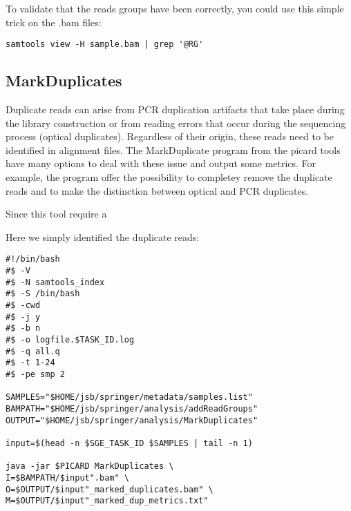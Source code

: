 To validate that the reads groups have been correctly, you could use this simple trick on the .bam files:

\begin{verbatim}
samtools view -H sample.bam | grep '@RG' 
\end{verbatim}






\subsection{MarkDuplicates}








Duplicate reads can arise from PCR duplication artifacts that take place during the library construction or from reading errors that occur during the sequencing process (optical duplicates). Regardless of their origin, these reads need to be identified in alignment files. The MarkDuplicate program from the picard tools have many options to deal with these issue and output some metrics. For example, the program offer the possibility to completey remove the duplicate reads and to make the distinction between optical and PCR duplicates.

Since this tool require a











Here we simply identified the duplicate reads:

\begin{verbatim}
#!/bin/bash
#$ -V
#$ -N samtools_index
#$ -S /bin/bash
#$ -cwd
#$ -j y
#$ -b n
#$ -o logfile.$TASK_ID.log
#$ -q all.q
#$ -t 1-24
#$ -pe smp 2

SAMPLES="$HOME/jsb/springer/metadata/samples.list"
BAMPATH="$HOME/jsb/springer/analysis/addReadGroups"
OUTPUT="$HOME/jsb/springer/analysis/MarkDuplicates"

input=$(head -n $SGE_TASK_ID $SAMPLES | tail -n 1)

java -jar $PICARD MarkDuplicates \
I=$BAMPATH/$input".bam" \
O=$OUTPUT/$input"_marked_duplicates.bam" \
M=$OUTPUT/$input"_marked_dup_metrics.txt"
\end{verbatim}





